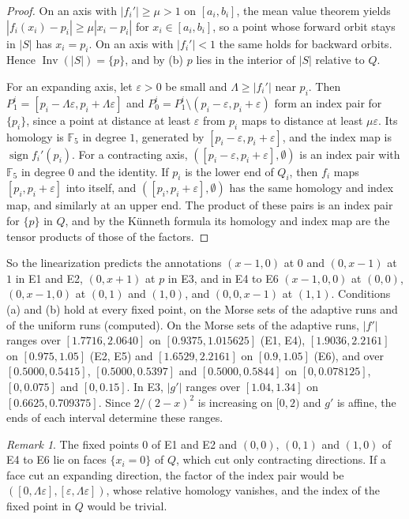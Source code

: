 \documentclass[11pt]{article}
\theoremstyle{plain}
\theoremstyle{definition}
\theoremstyle{remark}
\newtheorem{remark}[proposition]{Remark}
\DeclareMathOperator{\Inv}{Inv}
\DeclareMathOperator{\sign}{sign}
\newcommand{\F}{\mathbb{F}_5}
\begin{document}
\begin{proof}
On an axis with $|f_i'|\geq\mu>1$ on $[a_i,b_i]$, the mean value theorem yields $|f_i(x_i)-p_i|\geq\mu|x_i-p_i|$ for $x_i\in[a_i,b_i]$, so a point whose forward orbit stays in $|S|$ has $x_i=p_i$. On an axis with $|f_i'|<1$ the same holds for backward orbits. Hence $\Inv(|S|)=\{p\}$, and by (b) $p$ lies in the interior of $|S|$ relative to $Q$.

For an expanding axis, let $\varepsilon>0$ be small and $\Lambda\geq|f_i'|$ near $p_i$. Then $P_1^i=[p_i-\Lambda\varepsilon,p_i+\Lambda\varepsilon]$ and $P_0^i=P_1^i\setminus(p_i-\varepsilon,p_i+\varepsilon)$ form an index pair for $\{p_i\}$, since a point at distance at least $\varepsilon$ from $p_i$ maps to distance at least $\mu\varepsilon$. Its homology is $\F$ in degree $1$, generated by $[p_i-\varepsilon,p_i+\varepsilon]$, and the index map is $\sign f_i'(p_i)$. For a contracting axis, $([p_i-\varepsilon,p_i+\varepsilon],\emptyset)$ is an index pair with $\F$ in degree $0$ and the identity. If $p_i$ is the lower end of $Q_i$, then $f_i$ maps $[p_i,p_i+\varepsilon]$ into itself, and $([p_i,p_i+\varepsilon],\emptyset)$ has the same homology and index map, and similarly at an upper end. The product of these pairs is an index pair for $\{p\}$ in $Q$, and by the K\"unneth formula its homology and index map are the tensor products of those of the factors.
\end{proof}

So the linearization predicts the annotations $(x-1,0)$ at $0$ and $(0,x-1)$ at $1$ in E1 and E2, $(0,x+1)$ at $p$ in E3, and in E4 to E6 $(x-1,0,0)$ at $(0,0)$, $(0,x-1,0)$ at $(0,1)$ and $(1,0)$, and $(0,0,x-1)$ at $(1,1)$. Conditions (a) and (b) hold at every fixed point, on the Morse sets of the adaptive runs and of the uniform runs (computed). On the Morse sets of the adaptive runs, $|f'|$ ranges over $[1.7716,2.0640]$ on $[0.9375,1.015625]$ (E1, E4), $[1.9036,2.2161]$ on $[0.975,1.05]$ (E2, E5) and $[1.6529,2.2161]$ on $[0.9,1.05]$ (E6), and over $[0.5000,0.5415]$, $[0.5000,0.5397]$ and $[0.5000,0.5844]$ on $[0,0.078125]$, $[0,0.075]$ and $[0,0.15]$. In E3, $|g'|$ ranges over $[1.04,1.34]$ on $[0.6625,0.709375]$. Since $2/(2-x)^2$ is increasing on $[0,2)$ and $g'$ is affine, the ends of each interval determine these ranges.

\begin{remark}\label{rem:face}
The fixed points $0$ of E1 and E2 and $(0,0)$, $(0,1)$ and $(1,0)$ of E4 to E6 lie on faces $\{x_i=0\}$ of $Q$, which cut only contracting directions. If a face cut an expanding direction, the factor of the index pair would be $([0,\Lambda\varepsilon],[\varepsilon,\Lambda\varepsilon])$, whose relative homology vanishes, and the index of the fixed point in $Q$ would be trivial.
\end{remark}
\end{document}
